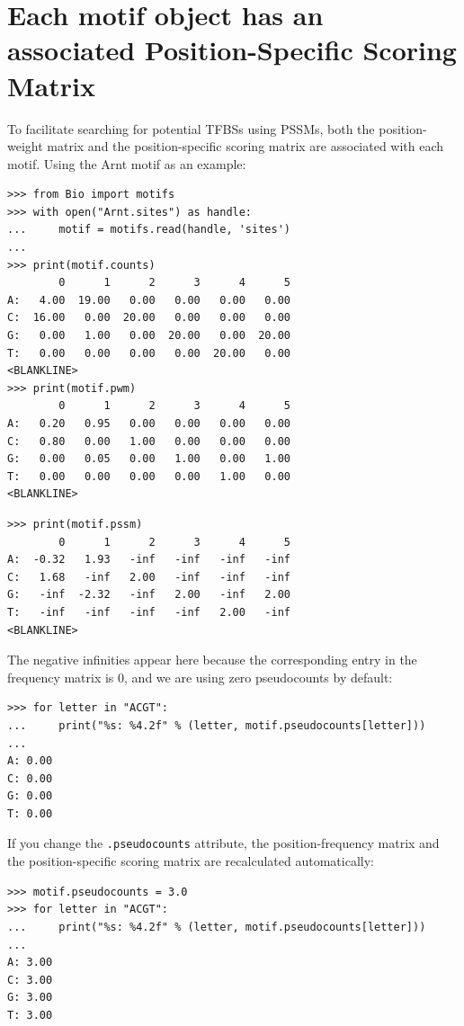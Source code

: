\documentclass{report}
\begin{document}
\section{Each motif object has an associated Position-Specific Scoring Matrix}

To facilitate searching for potential TFBSs using PSSMs, both the position-weight matrix and the position-specific scoring matrix are associated with each motif. Using the Arnt motif as an example:
\begin{verbatim}
>>> from Bio import motifs
>>> with open("Arnt.sites") as handle:
...     motif = motifs.read(handle, 'sites')
...
>>> print(motif.counts)
        0      1      2      3      4      5
A:   4.00  19.00   0.00   0.00   0.00   0.00
C:  16.00   0.00  20.00   0.00   0.00   0.00
G:   0.00   1.00   0.00  20.00   0.00  20.00
T:   0.00   0.00   0.00   0.00  20.00   0.00
<BLANKLINE>
>>> print(motif.pwm)
        0      1      2      3      4      5
A:   0.20   0.95   0.00   0.00   0.00   0.00
C:   0.80   0.00   1.00   0.00   0.00   0.00
G:   0.00   0.05   0.00   1.00   0.00   1.00
T:   0.00   0.00   0.00   0.00   1.00   0.00
<BLANKLINE>
\end{verbatim}
\begin{verbatim}
>>> print(motif.pssm)
        0      1      2      3      4      5
A:  -0.32   1.93   -inf   -inf   -inf   -inf
C:   1.68   -inf   2.00   -inf   -inf   -inf
G:   -inf  -2.32   -inf   2.00   -inf   2.00
T:   -inf   -inf   -inf   -inf   2.00   -inf
<BLANKLINE>
\end{verbatim}
The negative infinities appear here because the corresponding entry in the frequency matrix is 0, and we are using zero pseudocounts by default:
\begin{verbatim}
>>> for letter in "ACGT":
...     print("%s: %4.2f" % (letter, motif.pseudocounts[letter]))
... 
A: 0.00
C: 0.00
G: 0.00
T: 0.00
\end{verbatim}
If you change the \verb+.pseudocounts+ attribute, the position-frequency matrix and the position-specific scoring matrix are recalculated automatically:
\begin{verbatim}
>>> motif.pseudocounts = 3.0
>>> for letter in "ACGT":
...     print("%s: %4.2f" % (letter, motif.pseudocounts[letter]))
... 
A: 3.00
C: 3.00
G: 3.00
T: 3.00
\end{verbatim}
\end{document}
